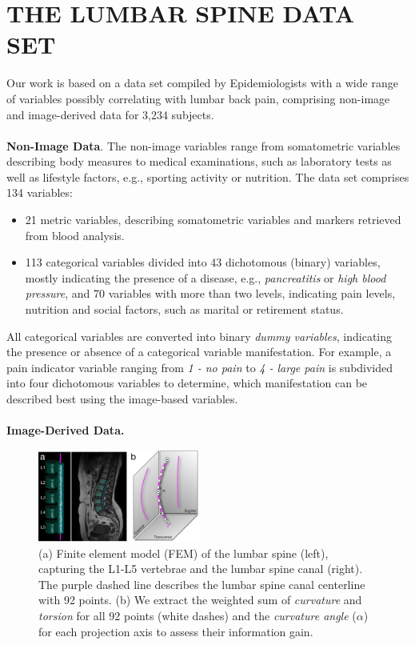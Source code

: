 \documentclass[a4paper,twoside]{style/article}
\begin{document}
\section{\uppercase{The Lumbar Spine Data Set}}
\label{sec:MaterialsAndMethod}
\noindent Our work is based on a data set compiled by Epidemiologists with a wide range of variables possibly correlating with lumbar back pain, comprising non-image and image-derived data for 3,234 subjects.
\\\\
\noindent \textbf{Non-Image Data}.
The non-image variables range from somatometric variables describing body measures to medical examinations, such as laboratory tests as well as lifestyle factors, e.g., sporting activity or nutrition.
The data set comprises 134 variables: %
\begin{itemize}
	\item 21 metric variables, describing somatometric variables and markers retrieved from blood analysis.
	\item 113 categorical variables divided into 43 dichotomous (binary) variables, mostly indicating the presence of a disease, e.g., \emph{pancreatitis} or \emph{high blood pressure}, and 70 variables with more than two levels, indicating pain levels, nutrition and social factors, such as marital or retirement status.
\end{itemize}
All categorical variables are converted into binary \emph{dummy variables}, indicating the presence or absence of a categorical variable manifestation.
For example, a pain indicator variable ranging from \emph{1 - no pain} to \emph{4 - large pain} is subdivided into four dichotomous variables to determine, which manifestation can be described best using the image-based variables.
\\\\
\noindent \textbf{Image-Derived Data.}
\begin{figure}[!t]
  \centering
  \includegraphics[width=0.475\textwidth]{figures/centerline}
  \caption{
	(a) Finite element model (FEM) of the lumbar spine (left), capturing the L1-L5 vertebrae and the lumbar spine canal (right).
	The purple dashed line describes the lumbar spine canal centerline with 92 points.
	(b) We extract the weighted sum of \emph{curvature} and \emph{torsion} for all 92 points (white dashes) and the \emph{curvature angle} ($\alpha$) for each projection axis to assess their information gain. %
	}
  \label{fig:centerline}
\end{figure}
\end{document}
